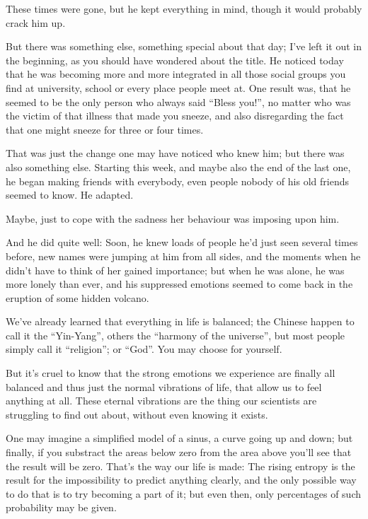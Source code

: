 These times were gone, but he kept everything in mind, though it would probably crack him up.

But there was something else, something special about that day; I've left it out in the beginning, as you should have wondered about the title. 
He noticed today that he was becoming more and more integrated in all those social groups you find at university, school or every place people meet at. 
One result was, that he seemed to be the only person who always said \enquote{Bless you!}, no matter who was the victim of that illness that made you sneeze, and also disregarding the fact that one might sneeze for three or four times.

That was just the change one may have noticed who knew him; but there was also something else. Starting this week, and maybe also the end of the last one, he began making friends with everybody, even people nobody of his old friends seemed to know. 
He adapted.

Maybe, just to cope with the sadness her behaviour was imposing upon him.

And he did quite well: Soon, he knew loads of people he'd just seen several times before, new names were jumping at him from all sides, and the moments when he didn't have to think of her gained importance; but when he was alone, he was more lonely than ever, and his suppressed emotions seemed to come back in the eruption of some hidden volcano.

We've already learned that everything in life is balanced; the Chinese happen to call it the \enquote{Yin-Yang}, others the \enquote{harmony of the universe}, but most people simply call it \enquote{religion}; or \enquote{God}. 
You may choose for yourself.

But it's cruel to know that the strong emotions we experience are finally all balanced and thus just the normal vibrations of life, that allow us to feel anything at all. 
These eternal vibrations are the thing our scientists are struggling to find out about, without even knowing it exists.

One may imagine a simplified model of a sinus, a curve going up and down; but finally, if you substract the areas below zero from the area above you'll see that the result will be zero. That's the way our life is made: The rising entropy is the result for the impossibility to predict anything clearly, and the only possible way to do that is to try becoming a part of it; but even then, only percentages of such probability may be given.

